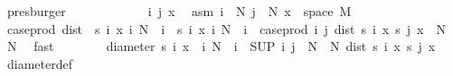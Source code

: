 \begin{isabellebody}
\ presburger\isanewline
\ \ \ \ \isacommand{{\isacharbraceleft}{\kern0pt}}\isamarkupfalse%
\isanewline
\ \ \ \ \ \ \isamarkupfalse%
\ i\ j\ x\ \isamarkupfalse%
\ asm{\isacharcolon}{\kern0pt}\ {\isachardoublequoteopen}i\ {\isasymge}\ N{\isachardoublequoteclose}\ {\isachardoublequoteopen}j\ {\isasymge}\ N{\isachardoublequoteclose}\ {\isachardoublequoteopen}x\ {\isasymin}\ space\ M{\isachardoublequoteclose}\isanewline
\ \ \ \ \ \ \isamarkupfalse%
\ {\isachardoublequoteopen}case{\isacharunderscore}{\kern0pt}prod\ dist\ {\isacharbackquote}{\kern0pt}\ {\isacharparenleft}{\kern0pt}{\isacharbraceleft}{\kern0pt}s\ i\ x\ {\isacharbar}{\kern0pt}i{\isachardot}{\kern0pt}\ N\ {\isasymle}\ i{\isacharbraceright}{\kern0pt}\ {\isasymtimes}\ {\isacharbraceleft}{\kern0pt}s\ i\ x\ {\isacharbar}{\kern0pt}i{\isachardot}{\kern0pt}\ N\ {\isasymle}\ i{\isacharbraceright}{\kern0pt}{\isacharparenright}{\kern0pt}\ {\isacharequal}{\kern0pt}\ case{\isacharunderscore}{\kern0pt}prod\ {\isacharparenleft}{\kern0pt}{\isasymlambda}i\ j{\isachardot}{\kern0pt}\ dist\ {\isacharparenleft}{\kern0pt}s\ i\ x{\isacharparenright}{\kern0pt}\ {\isacharparenleft}{\kern0pt}s\ j\ x{\isacharparenright}{\kern0pt}{\isacharparenright}{\kern0pt}\ {\isacharbackquote}{\kern0pt}\ {\isacharparenleft}{\kern0pt}{\isacharbraceleft}{\kern0pt}N{\isachardot}{\kern0pt}{\isachardot}{\kern0pt}{\isacharbraceright}{\kern0pt}\ {\isasymtimes}\ {\isacharbraceleft}{\kern0pt}N{\isachardot}{\kern0pt}{\isachardot}{\kern0pt}{\isacharbraceright}{\kern0pt}{\isacharparenright}{\kern0pt}{\isachardoublequoteclose}\ \isamarkupfalse%
\ fast\isanewline
\ \ \ \ \ \ \isamarkupfalse%
\ {\isachardoublequoteopen}diameter\ {\isacharbraceleft}{\kern0pt}s\ i\ x\ {\isacharbar}{\kern0pt}\ i{\isachardot}{\kern0pt}\ N\ {\isasymle}\ i{\isacharbraceright}{\kern0pt}\ {\isacharequal}{\kern0pt}\ {\isacharparenleft}{\kern0pt}SUP\ {\isacharparenleft}{\kern0pt}i{\isacharcomma}{\kern0pt}\ j{\isacharparenright}{\kern0pt}\ {\isasymin}\ {\isacharbraceleft}{\kern0pt}N{\isachardot}{\kern0pt}{\isachardot}{\kern0pt}{\isacharbraceright}{\kern0pt}\ {\isasymtimes}\ {\isacharbraceleft}{\kern0pt}N{\isachardot}{\kern0pt}{\isachardot}{\kern0pt}{\isacharbraceright}{\kern0pt}{\isachardot}{\kern0pt}\ dist\ {\isacharparenleft}{\kern0pt}s\ i\ x{\isacharparenright}{\kern0pt}\ {\isacharparenleft}{\kern0pt}s\ j\ x{\isacharparenright}{\kern0pt}{\isacharparenright}{\kern0pt}{\isachardoublequoteclose}\ \isamarkupfalse%
\ diameter{\isacharunderscore}{\kern0pt}def\ \isamarkupfalse%

\end{isabellebody}
